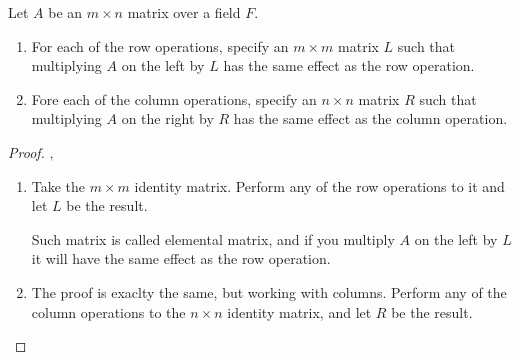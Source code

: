 \prob
{
    Let $A$ be an $m \times n$ matrix over a field $F$.
    \begin{enumerate}[label=(\roman*)]
        \item For each of the row operations, specify an $m \times m$ matrix $L$ such that
              multiplying $A$ on the left by $L$ has the same effect as the row operation.\pn
        \item Fore each of the column operations, specify an $n \times n$ matrix $R$ such that multiplying $A$ on the right
                by $R$ has the same effect as the column operation.
    \end{enumerate}
}
\begin{proof}$,$\pn
    \begin{enumerate}
        \item         
            Take the $m \times m$ identity matrix. Perform any of the row operations to it and let $L$
            be the result.\pn
        
            Such matrix is called elemental matrix,  and if you multiply $A$ on the left by $L$ it will have the
            same effect as the row operation.
            
        \item
            The proof is exaclty the same, but working with columns. Perform any of the column operations to the
            $n \times n$ identity matrix, and let $R$ be the result.
    \end{enumerate}
\end{proof}